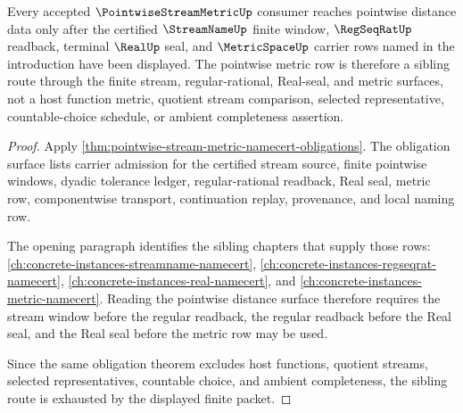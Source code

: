 \begin{theorem}
\label{thm:pointwise-stream-metric-sibling-route}
Every accepted $\PointwiseStreamMetricUp$ consumer reaches pointwise distance data only after the certified $\StreamNameUp$ finite window, $\RegSeqRatUp$ readback, terminal $\RealUp$ seal, and $\MetricSpaceUp$ carrier rows named in the introduction have been displayed. The pointwise metric row is therefore a sibling route through the finite stream, regular-rational, Real-seal, and metric surfaces, not a host function metric, quotient stream comparison, selected representative, countable-choice schedule, or ambient completeness assertion.
\end{theorem}
\begin{proof}
Apply \autoref{thm:pointwise-stream-metric-namecert-obligations}. The obligation surface lists carrier admission for the certified stream source, finite pointwise windows, dyadic tolerance ledger, regular-rational readback, Real seal, metric row, componentwise transport, continuation replay, provenance, and local naming row.

The opening paragraph identifies the sibling chapters that supply those rows: \autoref{ch:concrete-instances-streamname-namecert}, \autoref{ch:concrete-instances-regseqrat-namecert}, \autoref{ch:concrete-instances-real-namecert}, and \autoref{ch:concrete-instances-metric-namecert}. Reading the pointwise distance surface therefore requires the stream window before the regular readback, the regular readback before the Real seal, and the Real seal before the metric row may be used.

Since the same obligation theorem excludes host functions, quotient streams, selected representatives, countable choice, and ambient completeness, the sibling route is exhausted by the displayed finite packet.
\end{proof}

